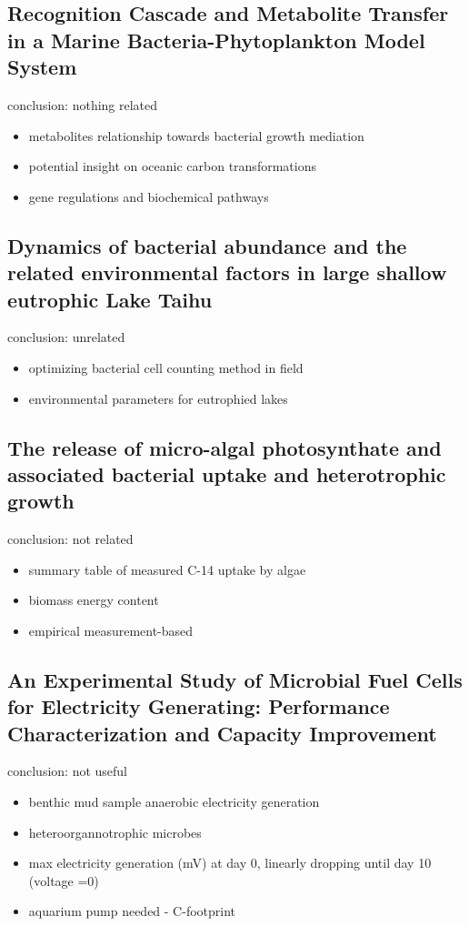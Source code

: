 \documentclass[a4paper,11pt]{article}
\begin{document}
    \subsection{Recognition Cascade and Metabolite Transfer in a Marine Bacteria-Phytoplankton Model System}
    conclusion\autocite{durham2017recognition}: nothing related
    \begin{itemize}
        \item metabolites relationship towards bacterial growth mediation
        \item potential insight on oceanic carbon transformations
        \item gene regulations and biochemical pathways
    \end{itemize}
    
    \subsection{Dynamics of bacterial abundance and the related environmental factors in large shallow eutrophic Lake Taihu}
    conclusion\autocite{gong2017dynamics}: unrelated
    \begin{itemize}
        \item optimizing bacterial cell counting method in field
        \item environmental parameters for eutrophied lakes
    \end{itemize}
    
    \subsection{The release of micro-algal photosynthate and associated bacterial uptake and heterotrophic growth}
    conclusion\autocite{jones1986release}: not related
    \begin{itemize}
        \item summary table of measured C-14 uptake by algae
        \item biomass energy content
        \item empirical measurement-based
    \end{itemize}
    
    \subsection{An Experimental Study of Microbial Fuel Cells for Electricity Generating: Performance Characterization and Capacity Improvement}
    conclusion\autocite{li2013experimental}: not useful
    \begin{itemize}
        \item benthic mud sample anaerobic electricity generation
        \item heteroorgannotrophic microbes
        \item max electricity generation (mV) at day 0, linearly dropping until day 10 (voltage =0)
        \item aquarium pump needed - C-footprint
    \end{itemize}
    
\end{document}
